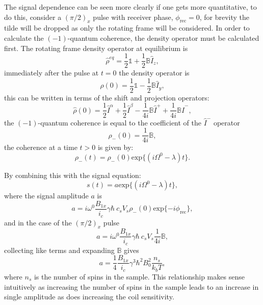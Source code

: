 The signal dependence can be seen more clearly if one gets more quantitative, to do this,
consider a $(\pi/2)_x$ pulse with receiver phase, $\phi_{\text{rec}} = 0$, for brevity the
tilde will be dropped as only the rotating frame will be considered. In order to calculate the $(-1)$-quantum coherence,
the density operator must be calculated first. The rotating frame density operator at equilibrium is
\begin{equation}
  \hat{\rho}^{eq} = \frac{1}{2}\mathbb{1} + \frac{1}{2}\mathbb{B}\hat{I}_z,
\end{equation}
immediately after the pulse at $t=0$ the density operator is
\begin{equation}
  \hat{\rho}(0) = \frac{1}{2}\mathbb{1} - \frac{1}{2}\mathbb{B}\hat{I}_y,
\end{equation}
this can be written in terms of the shift and projection operators:
\begin{equation}
  \hat{\rho}(0) = \frac{1}{2}\hat{I}^{\alpha} + \frac{1}{2}\hat{I}^{\beta} - \frac{1}{4i}\mathbb{B}\hat{I}^+ + \frac{1}{4i}\mathbb{B}\hat{I}^-,
\end{equation}
the $(-1)$-quantum coherence is equal to the coefficient of the $\hat{I}^-$ operator
\begin{equation}
  \rho_-(0) = \frac{1}{4i}\mathbb{B},
\end{equation}
the coherence at a time $t>0$ is given by:
\begin{equation}
  \rho_-(t) = \rho_-(0)\text{exp}\{(i\Omega^0 -\lambda)t\}.
\end{equation}

By combining this with the signal equation:
\begin{equation}
  s(t) = a \text{exp}\{(i\Omega^0 -\lambda)t\},
\end{equation}
where the signal amplitude $a$ is
\begin{equation}
  a = i\omega^0\frac{B_{1x}}{i_c}\gamma\hbar~c_sV_s\rho_-(0)\text{exp}\{-i\phi_{\text{rec}}\},
\end{equation}
and in the case of the $(\pi/2)_x$ pulse
\begin{equation}
  a = i\omega^0\frac{B_{1x}}{i_c}\gamma\hbar~c_sV_s\frac{1}{4i}\mathbb{B},
\end{equation}
collecting like terms and expanding $\mathbb{B}$ gives
\begin{equation}
  a = \frac{1}{4}\frac{B_{1x}}{i_c}\gamma^3\hbar^2B_0^2\frac{n_s}{k_bT},
\end{equation}
where $n_s$ is the number of spins in the sample. This relationship makes sense intuitively
as increasing the number of spins in the sample leads to an increase in single amplitude as does increasing the
coil sensitivity.

